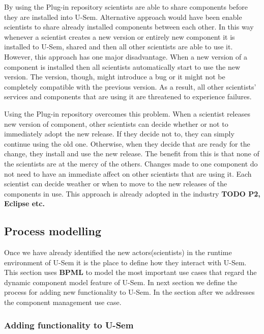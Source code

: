 By using the Plug-in repository scientists are able to share components before they are installed into U-Sem. Alternative approach would have been enable scientists to share already installed components between each other. In this way whenever a scientist creates a new version or entirely new component it is installed to U-Sem, shared and then all other scientists are able to use it. However, this approach has one major disadvantage. When a new version of a component is installed then all scientists automatically start to use the new version. The version, though, might introduce a bug or it might not be completely compatible with the previous version. As a result, all other scientists' services and components that are using it are threatened to experience failures. 

Using the Plug-in repository overcomes this problem. When a scientist releases new version of component, other scientists can decide whether or not to immediately adopt the new release. If they decide not to, they can simply continue using the old one. Otherwise, when they decide that are ready for the change, they install and use the new release. The benefit from this is that none of the scientists are at the mercy of the others. Changes made to one component do not need to have an immediate affect on other scientists that are using it. Each scientist can decide weather or when to move to the new releases of the components in use. This approach is already adopted in the industry \textbf{TODO P2, Eclipse etc.}


\subsection{Process modelling}

Once we have already identified the new actors(scientists) in the runtime environment of U-Sem it is the place to define how they interact with U-Sem. This section uses \textbf{BPML} to model the most important use cases that regard the dynamic component model feature of U-Sem. In next section we define the process for adding new functionality to U-Sem. In the section after we addresses the component management use case.

\subsubsection{Adding functionality to U-Sem}

